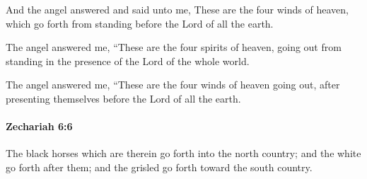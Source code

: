 			\begin{versebox}
					\item[BHS] 
					\item[LXX] 
					\item[ASV] And the angel answered and said unto me, These are the four winds of heaven, which go forth from standing before the Lord of all the earth.
					\item[NIV] The angel answered me, “These are the four spirits of heaven, going out from standing in the presence of the Lord of the whole world.
					\item[NRSV] The angel answered me, “These are the four winds of heaven going out, after presenting themselves before the Lord of all the earth.
			\end{versebox}

		\paragraph{Zechariah 6:6} %
			\label{ZECHARIAH-6-6}

			The black horses which are therein go forth into the north country; and the white go forth after them; and the grisled go forth toward the south country.

